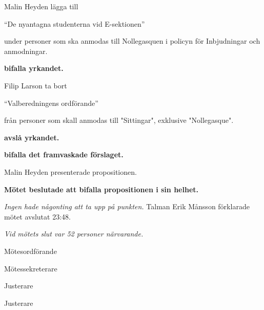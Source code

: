 \documentclass[10pt]{article}
\def\mo{Erik Månsson}
\def\ms{Axel Voss}
\def\ji{Johan Karlberg}
\def\jii{Rasmus Sobel}
\begin{document}
\begin{paragrafer}
\begin{paragrafer}
		Malin Heyden \ypa lägga till 
		\begin{tightdashlist}
			\item ``De nyantagna studenterna vid E-sektionen''
		\end{tightdashlist}
		
		under personer som ska anmodas till Nollegasquen i policyn för Inbjudningar och anmodningar.

		\textbf{\Mba bifalla yrkandet.}

		Filip Larson \ypa ta bort 

		\begin{tightdashlist}
			\item ``Valberedningens ordförande''
		\end{tightdashlist}
		
		från personer som skall anmodas till "Sittingar", exklusive "Nollegasque".

		\textbf{\Mba avslå yrkandet.}

		\textbf{\Mba bifalla det framvaskade förslaget.}


		Malin Heyden presenterade propositionen.

		\textbf{Mötet beslutade att bifalla propositionen i sin helhet.}

    \end{paragrafer}


\emph{Ingen hade någonting att ta upp på punkten.}
Talman {\mo} förklarade mötet avslutat 23:48.

\emph{Vid mötets slut var 52 personer närvarande.}
 
\end{paragrafer}

\hidesignfoot
\begin{signatures}{4}
\signature{\mo}{Mötesordförande}
\signature{\ms}{Mötessekreterare}
\signature{\ji}{Justerare}
\signature{\jii}{Justerare}
\end{signatures}
\end{document}

